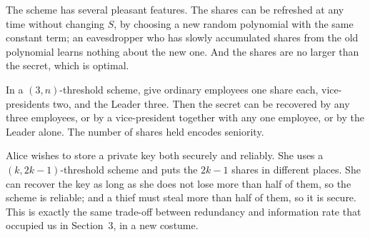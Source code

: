 \documentclass[a4paper]{scrartcl}
\begin{document}
\begin{remark}
	The scheme has several pleasant features. The shares can be refreshed at any time without changing $S$, by choosing a new random polynomial with the same constant term; an eavesdropper who has slowly accumulated shares from the old polynomial learns nothing about the new one. And the shares are no larger than the secret, which is optimal.
\end{remark}

\begin{example}
	In a $(3,n)$-threshold scheme, give ordinary employees one share each, vice-presidents two, and the Leader three. Then the secret can be recovered by any three employees, or by a vice-president together with any one employee, or by the Leader alone. The number of shares held encodes seniority.
\end{example}

\begin{example}
	Alice wishes to store a private key both securely and reliably. She uses a $(k,2k-1)$-threshold scheme and puts the $2k-1$ shares in different places. She can recover the key as long as she does not lose more than half of them, so the scheme is reliable; and a thief must steal more than half of them, so it is secure. This is exactly the same trade-off between redundancy and information rate that occupied us in Section~3, in a new costume.
\end{example}
\end{document}
